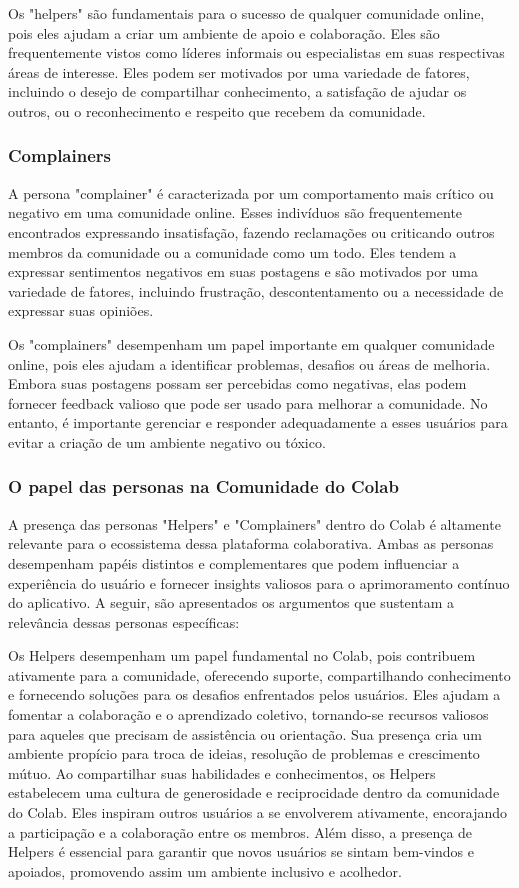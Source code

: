 Os "helpers" são fundamentais para o sucesso de qualquer comunidade online, pois eles ajudam a criar um ambiente de apoio e colaboração. Eles são frequentemente vistos como líderes informais ou especialistas em suas respectivas áreas de interesse. Eles podem ser motivados por uma variedade de fatores, incluindo o desejo de compartilhar conhecimento, a satisfação de ajudar os outros, ou o reconhecimento e respeito que recebem da comunidade.

\subsubsection*{Complainers}

A persona "complainer" é caracterizada por um comportamento mais crítico ou negativo em uma comunidade online. Esses indivíduos são frequentemente encontrados expressando insatisfação, fazendo reclamações ou criticando outros membros da comunidade ou a comunidade como um todo. Eles tendem a expressar sentimentos negativos em suas postagens e são motivados por uma variedade de fatores, incluindo frustração, descontentamento ou a necessidade de expressar suas opiniões.

Os "complainers" desempenham um papel importante em qualquer comunidade online, pois eles ajudam a identificar problemas, desafios ou áreas de melhoria. Embora suas postagens possam ser percebidas como negativas, elas podem fornecer feedback valioso que pode ser usado para melhorar a comunidade. No entanto, é importante gerenciar e responder adequadamente a esses usuários para evitar a criação de um ambiente negativo ou tóxico.

\subsubsection*{O papel das personas na Comunidade do Colab}

A presença das personas "Helpers" e "Complainers" dentro do Colab é altamente relevante para o ecossistema dessa plataforma colaborativa. Ambas as personas desempenham papéis distintos e complementares que podem influenciar a experiência do usuário e fornecer insights valiosos para o aprimoramento contínuo do aplicativo. A seguir, são apresentados os argumentos que sustentam a relevância dessas personas específicas:

Os Helpers desempenham um papel fundamental no Colab, pois contribuem ativamente para a comunidade, oferecendo suporte, compartilhando conhecimento e fornecendo soluções para os desafios enfrentados pelos usuários. Eles ajudam a fomentar a colaboração e o aprendizado coletivo, tornando-se recursos valiosos para aqueles que precisam de assistência ou orientação. Sua presença cria um ambiente propício para troca de ideias, resolução de problemas e crescimento mútuo. Ao compartilhar suas habilidades e conhecimentos, os Helpers estabelecem uma cultura de generosidade e reciprocidade dentro da comunidade do Colab. Eles inspiram outros usuários a se envolverem ativamente, encorajando a participação e a colaboração entre os membros. Além disso, a presença de Helpers é essencial para garantir que novos usuários se sintam bem-vindos e apoiados, promovendo assim um ambiente inclusivo e acolhedor.

